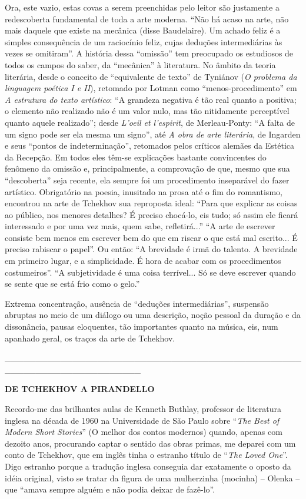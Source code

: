 Ora, este vazio, estas covas a serem preenchidas pelo leitor são
justamente a redescoberta fundamental de toda a arte moderna. ``Não há
acaso na arte, não mais daquele que existe na mecânica (disse
Baudelaire). Um achado feliz é a simples consequência de um raciocínio
feliz, cujas deduções intermediárias às vezes se omitiram''. A história
dessa ``omissão'' tem preocupado os estudiosos de todos os campos do
saber, da ``mecânica'' à literatura. No âmbito da teoria literária,
desde o conceito de ``equivalente de texto'' de Tyniánov (\emph{O
problema da linguagem poética I e II}), retomado por Lotman como
``menos-procedimento'' em \emph{A estrutura do texto artístico}: ``A
grandeza negativa é tão real quanto a positiva; o elemento não realizado
não é um valor nulo, mas tão nitidamente perceptível quanto aquele
realizado''; desde \emph{L'oeil et l'espirit}, de Merleau-Ponty: ``A
falta de um signo pode ser ela mesma um signo'', até \emph{A obra de
arte literária}, de Ingarden e seus ``pontos de indeterminação'',
retomados pelos críticos alemães da Estética da Recepção. Em todos eles
têm-se explicações bastante convincentes do fenômeno da omissão e,
principalmente, a comprovação de que, mesmo que sua ``descoberta'' seja
recente, ela sempre foi um procedimento inseparável do fazer artístico.
Obrigatório na poesia, inusitado na prosa até o fim do romantismo,
encontrou na arte de Tchekhov sua reproposta ideal: ``Para que explicar
as coisas ao público, nos menores detalhes? É preciso chocá-lo, eis
tudo; só assim ele ficará interessado e por uma vez mais, quem sabe,
refletirá...'' ``A arte de escrever consiste bem menos em escrever bem
do que em riscar o que está mal escrito... É preciso rabiscar o papel''.
Ou então: ``A brevidade é irmã do talento. A brevidade em primeiro
lugar, e a simplicidade. É hora de acabar com os procedimentos
costumeiros''. ``A subjetividade é uma coisa terrível... Só se deve
escrever quando se sente que se está frio como o gelo.''

Extrema concentração, ausência de ``deduções intermediárias'', suspensão
abruptas no meio de um diálogo ou uma descrição, noção pessoal da
duração e da dissonância, pausas eloquentes, tão importantes quanto na
música, eis, num apanhado geral, os traços da arte de Tchekhov.

\_\_\_\_\_\_\_\_\_\_\_\_\_\_\_\_\_\_\_\_\_\_\_\_\_\_\_\_\_\_\_\_\_\_\_\_\_\_\_\_\_\_\_\_\_\_\_\_\_\_\_\_\_\_\_\_\_\_\_\_\_\_\_\_\_\_\_\_\_\_

\textbf{DE TCHEKHOV A PIRANDELLO}

Recordo-me das brilhantes aulas de Kenneth Buthlay, professor de
literatura inglesa na década de 1960 na Universidade de São Paulo sobre
``\emph{The Best of Modern Short Stories}'' (O melhor dos contos
modernos) quando, apenas com dezoito anos, procurando captar o sentido
das obras primas, me deparei com um conto de Tchekhov, que em inglês
tinha o estranho título de ``\emph{The Loved One}''. Digo estranho
porque a tradução inglesa conseguia dar exatamente o oposto da idéia
original, visto se tratar da figura de uma mulherzinha (mocinha) --
Olenka -- que ``amava sempre alguém e não podia deixar de fazê-lo''.

